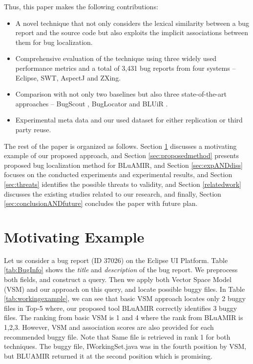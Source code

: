 \documentclass[conference]{IEEEtran}
\begin{document}
Thus, this paper makes the following contributions:
\begin{itemize}
	\item A novel technique that not only considers the lexical similarity between a bug report and the source code but also exploits the implicit associations between them for bug localization.
	\item Comprehensive evaluation of the technique using three widely used performance metrics and a total of 3,431 bug reports from four systems --Eclipse, SWT, AspectJ and ZXing.
	\item Comparison with not only two baselines \cite{vector-space-model,MarcusLSI} but also three state-of-the-art approaches -- BugScout \cite{Nguyen}, BugLocator \cite{Jian} and BLUiR \cite{Saha}.
	\item Experimental meta data and our used dataset for either replication or third party reuse.
\end{itemize}

The rest of the paper is organized as follows. Section \ref{sec:motivatingexample} discusses a motivating example of our proposed approach, and Section \ref{sec:proposedmethod} presents proposed bug localization method for BLuAMIR, and Section \ref{sec:expANDdiss} focuses on the conducted experiments and experimental results, and Section \ref{sec:threats} identifies the possible threats to validity, and Section \ref{relatedwork}
discusses the existing studies related to our research, and finally,  
Section \ref{sec:conclusionANDfuture} concludes the paper with future plan.
\section{Motivating Example}\label{sec:motivatingexample}
Let us consider a bug report (ID 37026) on the Eclipse UI Platform. Table \ref{tab:BugInfo} shows the \textit{title} and \textit{description} of the bug report. We preprocess both fields, and construct a query. Then we apply both Vector Space Model (VSM) and our approach on this query, and locate possible buggy files. 
In Table \ref{tab:workingexample}, we can see that basic VSM approach locates only 2 buggy files in Top-5 where, our proposed tool BLuAMIR correctly identifies 3 buggy files. The ranking from basic VSM is 1 and 4 where the rank from BLuAMIR is 1,2,3. However, VSM and association scores are also provided for each recommended buggy file. 
Note that Same file is retrieved in rank 1 for both techniques. 
The buggy file,  
IWorkingSet.java was in the fourth position by VSM, but BLUAMIR returned it at the second position which is promising.
\end{document}
